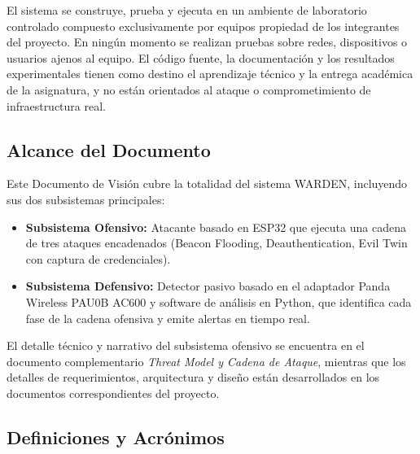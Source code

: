 \documentclass[11pt,a4paper]{article}
\begin{document}
El sistema se construye, prueba y ejecuta en un ambiente de laboratorio
controlado compuesto exclusivamente por equipos propiedad de los integrantes
del proyecto. En ningún momento se realizan pruebas sobre redes, dispositivos
o usuarios ajenos al equipo. El código fuente, la documentación y los
resultados experimentales tienen como destino el aprendizaje técnico y la
entrega académica de la asignatura, y no están orientados al ataque o
comprometimiento de infraestructura real.

\subsection{Alcance del Documento}
Este Documento de Visión cubre la totalidad del sistema WARDEN, incluyendo
sus dos subsistemas principales:

\begin{itemize}
  \item \textbf{Subsistema Ofensivo:} Atacante basado en ESP32 que ejecuta una
    cadena de tres ataques encadenados (Beacon Flooding, Deauthentication,
    Evil Twin con captura de credenciales).
  \item \textbf{Subsistema Defensivo:} Detector pasivo basado en el adaptador
    Panda Wireless PAU0B AC600 y software de análisis en Python, que
    identifica cada fase de la cadena ofensiva y emite alertas en tiempo real.
\end{itemize}

El detalle técnico y narrativo del subsistema ofensivo se encuentra en el
documento complementario \emph{Threat Model y Cadena de Ataque}, mientras que
los detalles de requerimientos, arquitectura y diseño están desarrollados en
los documentos correspondientes del proyecto.

\subsection{Definiciones y Acrónimos}
\end{document}
